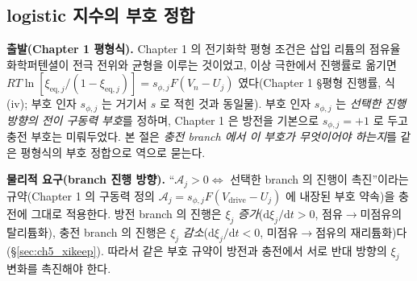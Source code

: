 \documentclass[11pt,a4paper]{article}
\newcommand{\dd}{\mathrm{d}}
\newcommand{\eq}{\mathrm{eq}}
\newcommand{\drive}{\mathrm{drive}}
\begin{document}
\subsection{logistic 지수의 부호 정합}\label{sec:ch5_sign_derive}
\textbf{출발(Chapter 1 평형식).} Chapter 1 의 전기화학 평형 조건은 삽입 리튬의 점유율 화학퍼텐셜이 전극 전위와
균형을 이루는 것이었고, 이상 극한에서 진행률로 옮기면 $RT\ln[\xi_{\eq,j}/(1-\xi_{\eq,j})]=s_{\phi,j}F(V_n-U_j)$
였다(Chapter 1 \S 평형 진행률, 식 (iv); 부호 인자 $s_{\phi,j}$ 는 거기서 $s$ 로 적힌 것과 동일물). 부호 인자
$s_{\phi,j}$ 는 \emph{선택한 진행 방향의 전이 구동력 부호}를 정하며, Chapter 1 은 방전을 기본으로 $s_{\phi,j}=+1$
로 두고 충전 부호는 미뤄두었다. 본 절은 \emph{충전 branch 에서 이 부호가 무엇이어야 하는지}를 같은 평형식의 부호
정합으로 역으로 묻는다.

\textbf{물리적 요구(branch 진행 방향).} ``$\mathcal A_j>0\Leftrightarrow$ 선택한 branch 의 진행이 촉진''이라는
규약(Chapter 1 의 구동력 정의 $\mathcal A_j=s_{\phi,j}F(V_\drive-U_j)$ 에 내장된 부호 약속)을 충전에 그대로
적용한다. 방전 branch 의 진행은 $\xi_j$ \emph{증가}($\dd\xi_j/\dd t>0$, 점유$\to$미점유의 탈리튬화), 충전 branch
의 진행은 $\xi_j$ \emph{감소}($\dd\xi_j/\dd t<0$, 미점유$\to$점유의 재리튬화)다(\S\ref{sec:ch5_xikeep}). 따라서
같은 부호 규약이 방전과 충전에서 서로 반대 방향의 $\xi_j$ 변화를 촉진해야 한다.
\end{document}
